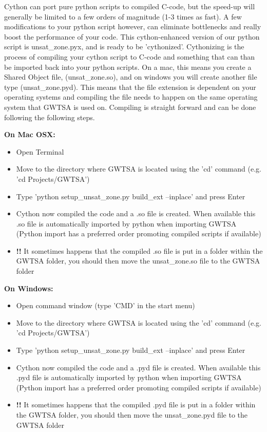 Cython can port pure python scripts to compiled C-code, but the speed-up will generally be limited to a few orders of magnitude (1-3 times as fast). A few modifications to your python script however, can eliminate bottlenecks and really boost the performance of your code. This cython-enhanced version of our python script is unsat\_zone.pyx, and is ready to be 'cythonized'. Cythonizing is the process of compiling your cython script to C-code and something that can than be imported back into your python scripts. On a mac, this means you create a Shared Object file, (unsat\_zone.so), and on windows you will create another file type (unsat\_zone.pyd). This means that the file extension is dependent on your operating systems and compiling the file needs to happen on the same operating system that GWTSA is used on. Compiling is straight forward and can be done following the following steps.

\textbf{On Mac OSX:}
\begin{itemize} 
\item{Open Terminal}
\item{Move to the directory where GWTSA is located using the 'cd' command (e.g. 'cd Projects/GWTSA')}
\item{Type 'python setup\_unsat\_zone.py build\_ext --inplace' and press Enter}
\item{Cython now compiled the code and a .so file is created. When available this .so file is automatically imported by python when importing GWTSA (Python import has a preferred order promoting compiled scripts if available) }
\item{\textbf{!!} It sometimes happens that the compiled .so file is put in a folder within the GWTSA folder, you should then move the unsat\_zone.so file to the GWTSA folder}
\end{itemize}

\textbf{On Windows:}
\begin{itemize} 
\item{Open command window (type 'CMD' in the start menu)}
\item{Move to the directory where GWTSA is located using the 'cd' command (e.g. 'cd Projects/GWTSA')}
\item{Type 'python setup\_unsat\_zone.py build\_ext --inplace' and press Enter}
\item{Cython now compiled the code and a .pyd file is created. When available this .pyd file is automatically imported by python when importing GWTSA (Python import has a preferred order promoting compiled scripts if available) }
\item{\textbf{!!} It sometimes happens that the compiled .pyd file is put in a folder within the GWTSA folder, you should then move the unsat\_zone.pyd file to the GWTSA folder}
\end{itemize}